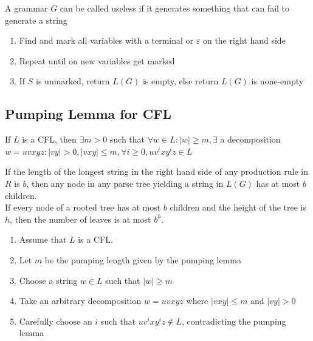 \documentclass[a4paper]{article}
\theoremstyle{plain}
\theoremstyle{definition}
\newtheorem{defn}{Definition}[section]
\theoremstyle{remark}
\begin{document}
\begin{tcolorbox}[colback=black!3!white,colframe=black!60!white,title=\begin{defn}Useless \label{Useless}\end{defn}]
A grammar $G$ can be called useless if it generates something that can fail to generate a string
\begin{enumerate}
	\item Find and mark all variables with a terminal or $\varepsilon$ on the right hand side
	\item Repeat until on new variables get marked
	\item If $S$ is unmarked, return $L(G)$ is empty, else return $L(G)$ is none-empty
\end{enumerate}
\end{tcolorbox}
\subsection{Pumping Lemma for CFL}
\begin{tcolorbox}[colback=black!3!white,colframe=black!60!white,title=\begin{defn}Pumping Lemma for CFL \label{Pumping Lemma for CFL}\end{defn}]
If $L$ is a CFL, then $\exists m>0$ such that $\forall w \in L : |w| \ge m, \exists $ a decomposition $w=uvxyz : |vy|>0,|vxy|\le m, \forall  i \ge 0, uv^{i}xy^{i}z \in L$
\end{tcolorbox}
\begin{tcolorbox}[colback=black!3!white,colframe=black!60!white,title=\begin{defn}Main Idea \label{Main Idea}\end{defn}]
If the length of the longest string in the right hand side of any production rule in $R$ is $b$, then any node in any parse tree yielding a string in $L(G)$ has at most $b$ children. \\
If every node of a rooted tree has at most $b$ children and the height of the tree is $h$, then the number of leaves is at most $b^{h}$. \\

\end{tcolorbox}
\begin{tcolorbox}[colback=black!3!white,colframe=black!60!white,title=\begin{defn}Using Lemma to show it is not CFL \label{Using Lemma to show it is not CFL}\end{defn}]
\begin{enumerate}
	\item Assume that $L$ is a CFL.
	\item Let $m$ be the pumping length given by the pumping lemma
	\item Choose a string $w \in L$ such that $|w|\ge m$ 
	\item Take an arbitrary decomposition  $w=uvxyz$ where $|vxy|\le m$ and $|vy|>0$ 
	\item Carefully choose an $i$ such that $uv^{i}xy^{i}z \not\in L$, contradicting the pumping lemma
\end{enumerate}
\end{tcolorbox}
\end{document}
